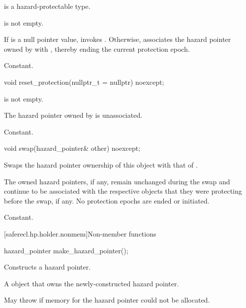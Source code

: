 \begin{itemdescr}
\pnum
\mandates
{} is a hazard-protectable type.

\pnum
\expects
{} is not empty.

\pnum
\effects
If  is a null pointer value, invokes .
Otherwise,
associates the hazard pointer owned by  with ,
thereby ending the current protection epoch.

\pnum
\complexity
Constant.
\end{itemdescr}

%
\begin{itemdecl}
void reset_protection(nullptr_t = nullptr) noexcept;
\end{itemdecl}

\begin{itemdescr}
\pnum
\expects
{} is not empty.

\pnum
\ensures
The hazard pointer owned by  is unassociated.

\pnum
\complexity
Constant.
\end{itemdescr}

%
\begin{itemdecl}
void swap(hazard_pointer& other) noexcept;
\end{itemdecl}

\begin{itemdescr}
\pnum
\effects
Swaps the hazard pointer ownership of this object with that of .
\begin{note}
The owned hazard pointers, if any, remain unchanged during the swap and
continue to be associated with the respective objects
that they were protecting before the swap, if any.
No protection epochs are ended or initiated.
\end{note}

\pnum
\complexity
Constant.
\end{itemdescr}

[saferecl.hp.holder.nonmem]{Non-member functions}

%
\begin{itemdecl}
hazard_pointer make_hazard_pointer();
\end{itemdecl}

\begin{itemdescr}
\pnum
\effects
Constructs a hazard pointer.

\pnum
\returns
A  object that owns the newly-constructed hazard pointer.

\pnum
\throws
May throw 
if memory for the hazard pointer could not be allocated.
\end{itemdescr}

